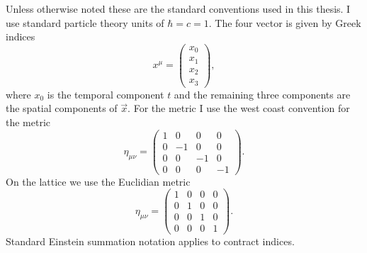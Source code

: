 
Unless otherwise noted these are the standard conventions used in this thesis.
I use standard particle theory units of $\hbar=c=1$.
The four vector is given by Greek indices
\begin{equation}
  x^\mu=\left(\begin{matrix} x_0 \\ x_1 \\ x_2 \\ x_3\end{matrix}\right),
\end{equation}
where $x_0$ is the temporal component $t$ and the remaining three components are the spatial components of $\vec x$.
For the metric I use the west coast convention for the metric
\begin{equation}
  \eta_{\mu\nu} = \left(\begin{matrix}1& 0 & 0 & 0 \\
                                      0&-1 & 0 & 0 \\
                                      0& 0 &-1 & 0 \\
                                      0& 0 & 0 &-1\end{matrix}\right).
\end{equation}
On the lattice we use the Euclidian metric
\begin{equation}
  \eta_{\mu\nu} = \left(\begin{matrix}1& 0 & 0 & 0 \\
                                      0& 1 & 0 & 0 \\
                                      0& 0 & 1 & 0 \\
                                      0& 0 & 0 & 1\end{matrix}\right).
\end{equation}
Standard Einstein summation notation applies to contract indices.

